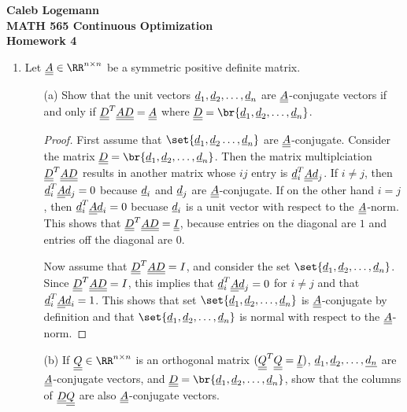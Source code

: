 \documentclass[11pt, oneside]{article}
\begin{document}
\noindent \textbf{\Large{Caleb Logemann \\
MATH 565 Continuous Optimization \\
Homework 4
}}

%
\begin{enumerate}
  \item %
    Let $\M{A} \in \RR^{n \times n}$ be a symmetric positive definite matrix.
    \begin{enumerate}
      \item[(a)] %
        Show that the unit vectors $\underline{d}_1, \underline{d}_2, \ldots, \underline{d}_n$ are
        $\underline{\underline{A}}$-conjugate vectors if and only if $\underline{\underline{D}}^T \underline{\underline{A}} \underline{\underline{D}} = \underline{\underline{A}}$
        where $\M{D} = \br{\v{d}_1, \v{d}_2, \ldots, \v{d}_n}$.

        \begin{proof}
          First assume that $\set{\v{d}_1, \v{d}_2 \ldots, \v{d}_n}$ are
          $\underline{\underline{A}}$-conjugate.
          Consider the matrix $\M{D} = \br{\v{d}_1, \v{d}_2, \ldots, \v{d}_n}$.
          Then the matrix multiplciation $\underline{\underline{D}}^T \underline{\underline{A}} \underline{\underline{D}}$ results in
          another matrix whose $ij$ entry is $\underline{d}_i^T \underline{\underline{A}} \underline{d}_j$.
          If $i \neq j$, then $\underline{d}_i^T \underline{\underline{A}} \underline{d}_j = 0$ because $\underline{d}_i$
          and $\underline{d}_j$ are $\underline{\underline{A}}$-conjugate.
          If on the other hand $i = j$, then $\underline{d}_i^T \underline{\underline{A}} \underline{d}_i = 0$
          becuase $\underline{d}_i$ is a unit vector with respect to the $\underline{\underline{A}}$-norm.
          This shows that $\underline{\underline{D}}^T \underline{\underline{A}} \underline{\underline{D}} = \underline{\underline{I}}$, because entries on the
          diagonal are $1$ and entries off the diagonal are $0$.

          Now assume that $\underline{\underline{D}}^T \underline{\underline{A}} \underline{\underline{D}} = I$, and consider the set
          $\set{\v{d}_1, \v{d}_2, \ldots, \v{d}_n}$.
          Since $\underline{\underline{D}}^T \underline{\underline{A}} \underline{\underline{D}} = I$, this implies that
          $\underline{d}_i^T \underline{\underline{A}} \underline{d}_j = 0$ for $i \neq j$ and that
          $\underline{d}_i^T \underline{\underline{A}} \underline{d}_i = 1$.
          This shows that set $\set{\v{d}_1, \v{d}_2, \ldots, \v{d}_n}$ is
          $\underline{\underline{A}}$-conjugate by definition and that
          $\set{\v{d}_1, \v{d}_2, \ldots, \v{d}_n}$ is normal with respect to
          the $\underline{\underline{A}}$-norm.
        \end{proof}

      \item[(b)] %
        If $\M{Q} \in \RR^{n \times n}$ is an orthogonal matrix
        $(\underline{\underline{Q}}^T \underline{\underline{Q}} = \underline{\underline{I}})$, $\underline{d}_1, \underline{d}_2, \ldots, \underline{d_n}$ are
        $\underline{\underline{A}}$-conjugate vectors, and
        $\M{D} = \br{\v{d}_1, \v{d}_2, \ldots, \v{d}_n}$, show that the columns
        of $\underline{\underline{D}} \underline{\underline{Q}}$ are also $\underline{\underline{A}}$-conjugate vectors.


\end{enumerate}
\end{enumerate}
\end{document}
